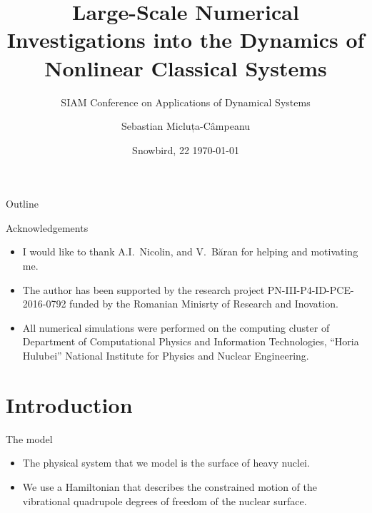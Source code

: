 \documentclass{beamer}
\title{Large-Scale Numerical Investigations into the Dynamics of Nonlinear Classical Systems}
\subtitle{SIAM Conference on Applications of Dynamical Systems}
\date{Snowbird, 22 \printdayoff\today}
\author{Sebastian Micluța-Câmpeanu}
\institute{University of Bucharest}
\begin{document}
\maketitle%


\begin{frame}{Outline}
  \tableofcontents[]
\end{frame}


\begin{frame}{Acknowledgements}
	\begin{itemize}
		\item I would like to thank A.I.~Nicolin, and V.~Băran for helping and motivating me.
		\item The author has been	supported by the research project PN-III-P4-ID-PCE-2016-0792
		funded by the Romanian Minisrty of Research and Inovation.
		\item All numerical simulations were performed on the computing cluster of
		Department of Computational Physics and Information Technologies,
		``Horia Hulubei'' National Institute for Physics and Nuclear Engineering.
	\end{itemize}
\end{frame}

\section{Introduction}


\begin{frame}{The model}
  \begin{itemize}
		\item The physical system that we model is the surface of heavy nuclei.
    \item We use a Hamiltonian that describes the constrained
		motion of the vibrational quadrupole degrees of freedom of
		the nuclear surface.
  \end{itemize}
\end{frame}

\end{document}
